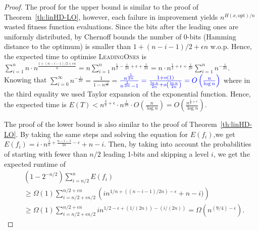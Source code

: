 \documentclass[lettersize,journal]{IEEEtran}
\begin{document}
\begin{proof}
The proof for the upper bound is similar to the proof of Theorem~\ref{th:linHD-LO}, however, each 
failure in improvement yields $n^{H(x, \text{opt})/n}$ wasted fitness function evaluations. 
Since the bits after the leading ones are uniformly distributed, by Chernoff bounds the number 
of 0-bits (Hamming distance to the optimum) is smaller than  $1+(n-i-1)/2+\epsilon n$ 
w.o.p. Hence, the expected time to optimise \textsc{LeadingOnes} is $\sum_{i=1}^{n} n \cdot 
n^{\frac{1+(n-i-1)/2+\epsilon n}{n}}= n \sum_{i=1}^{n} 
n^{\frac{1}{2}-\frac{i}{2n}+\epsilon+\frac{1}{2n}}=n \cdot n^{\frac{1}{2}+\epsilon+\frac{1}{2n}} \sum_{i=1}^{n} 
n^{-\frac{i}{2n}}$. Knowing that 
$\sum_{i=0}^{\infty}n^{-\frac{i}{2n}}=\frac{1}{1-n^{\frac{-1}{2n}}}=${$\color{blue} \frac{n^{\frac{1}{2n}}}{n^{\frac{1}{2n}} - 1} = \frac{1 + o(1)}{\frac{\ln{n}}{2n} + o\left(\frac{\ln{n}}{2n}\right)} = O\left(\frac{n}{\log{n}}\right)$ where in the third equality we used Taylor expansion of the exponential function.}  Hence, the expected time is $E(T) 
< n^{\frac{3}{2}+\epsilon} \cdot n^{\frac{1}{2n}} \cdot O\left(\frac{n}{\log n}\right)=O\left(\frac{n^{\frac{5}{2}+\epsilon}}{\log n}\right)$.



The proof of the lower bound is also similar to the proof of Theorem~\ref{th:linHD-LO}. 
By taking the same steps and solving the equation for $E(f_i)$,we get
$E(f_i)=i \cdot n^{\frac{1}{n}+\frac{n-i-1}{2n}-\epsilon}+n-i$. Then, by taking into account the probabilities of starting with fewer than $n/2$ leading 1-bits and skipping a level $i$, we get the expected runtime of 
\begin{align*}
&(1-2^{-n/2})\sum_{i=n/2}^{n} E(f_i)\\
&\geq \Omega(1) \sum_{i=n/2+\epsilon 
	n/2}^{n/2+\epsilon n} 
\left( i n^{1/n+((n-i-1)/2n)-\epsilon}+n-i )\right)\\
&\geq \Omega(1) \sum_{i=n/2+\epsilon 
	n/2}^{n/2+\epsilon n}  in^{1/2-\epsilon+(1/(2n))-(i/(2n))}= \Omega(n^{(9/4)-\epsilon}).
	\end{align*} 
\end{proof}




\end{document}

